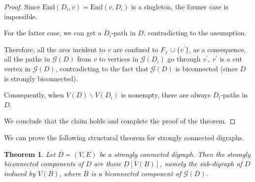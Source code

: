 \documentclass{article}
\newtheorem{thm}{Theorem}
\begin{document}
\begin{proof}
Since $\textrm{End}(D_i,v)=\textrm{End}(v,D_i)$ is a singleton, the
former case is impossible.

For the latter case, we can get a $D_i$-path in $D$, contradicting
to the assumption.

Therefore, all the arcs incident to $v$ are confined to
$F_{v^{\prime}} \cup \{v^\prime\}$, as a consequence, all the paths
in $\mathcal{G}(D)$ from $v$ to vertices in $\mathcal{G}(D_i)$ go
through $v^\prime$, $v^\prime$ is a cut vertex in $\mathcal{G}(D)$,
contradicting to the fact that $\mathcal{G}(D)$ is biconnected
(since $D$ is strongly biconnected).

Consequently, when $V(D) \backslash V(D_i)$ is nonempty, there are
always $D_i$-paths in $D$.

We conclude that the claim holds and complete the proof of the
theorem.

\end{proof}



\noindent We can prove the following structural theorem for strongly
connected digraphs.

\begin{thm}\label{thm:strong2}
Let $D=(V,E)$ be a strongly connected digraph. Then the strongly
biconnected components of $D$ are those $D[V(B)]$, namely the
sub-digraph of $D$ induced by $V(B)$, where $B$ is a biconnected
component of $\mathcal{G}(D)$.
\end{thm}
\end{document}

